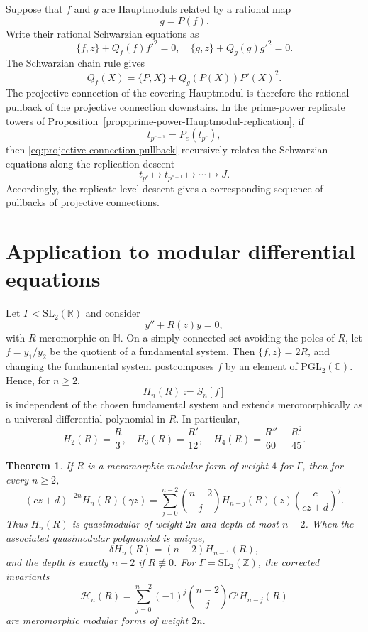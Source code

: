 \documentclass[11pt]{amsart}
\newtheorem{thm}{Theorem}[section]
\theoremstyle{definition}
\theoremstyle{remark}
\numberwithin{equation}{section}
\begin{document}
Suppose that $f$ and $g$ are Hauptmoduls related by a rational map
\[
g=P(f).
\]
Write their rational Schwarzian equations as
\[
\{f,z\}+Q_f(f)f'^2=0,
\quad
\{g,z\}+Q_g(g)g'^2=0.
\]
The Schwarzian chain rule gives
\begin{equation}\label{eq:projective-connection-pullback}
Q_f(X)
=
\{P,X\}+Q_g(P(X))P'(X)^2.
\end{equation}
The projective connection of the covering Hauptmodul is therefore the rational pullback of the projective connection downstairs. In the prime-power replicate towers of Proposition~\ref{prop:prime-power-Hauptmodul-replication}, if
\[
t_{p^{e-1}}=P_e(t_{p^e}),
\]
then \eqref{eq:projective-connection-pullback} recursively relates the Schwarzian equations along the replication descent
\[
t_{p^e}\longmapsto t_{p^{e-1}}\longmapsto\cdots\longmapsto J.
\]
Accordingly, the replicate level descent gives a corresponding sequence of pullbacks of projective connections.

\section{Application to modular differential equations}

Let \(\Gamma<\mathrm{SL}_2(\mathbb R)\) and consider
\begin{equation}\label{eq:ode}
y''+R(z)y=0,
\end{equation}
with \(R\) meromorphic on \(\mathbb H\). On a simply connected set avoiding the poles of \(R\), let \(f=y_1/y_2\) be the quotient of a fundamental system. Then \(\{f,z\}=2R\), and changing the fundamental system postcomposes \(f\) by an element of \(\mathrm{PGL}_2(\mathbb C)\). Hence, for \(n\ge2\),
\[
H_n(R):=S_n[f]
\]
is independent of the chosen fundamental system and extends meromorphically as a universal differential polynomial in \(R\). In particular,
\[
H_2(R)=\frac R3,
\quad
H_3(R)=\frac{R'}{12},
\quad
H_4(R)=\frac{R''}{60}+\frac{R^2}{45}.
\]

\begin{thm}\label{thm:ode-application}
If \(R\) is a meromorphic modular form of weight \(4\) for \(\Gamma\), then for every \(n\ge2\),
\begin{equation}\label{eq:H-transformation}
(cz+d)^{-2n}H_n(R)(\gamma z)
=
\sum_{j=0}^{n-2}\binom{n-2}{j}H_{n-j}(R)(z)
\left(\frac{c}{cz+d}\right)^j.
\end{equation}
Thus \(H_n(R)\) is quasimodular of weight \(2n\) and depth at most \(n-2\). When the associated quasimodular polynomial is unique,
\[
\delta H_n(R)=(n-2)H_{n-1}(R),
\]
and the depth is exactly \(n-2\) if \(R\not\equiv0\). For \(\Gamma=\mathrm{SL}_2(\mathbb Z)\), the corrected invariants
\[
\mathcal H_n(R)
=
\sum_{j=0}^{n-2}(-1)^j\binom{n-2}{j}C^jH_{n-j}(R)
\]
are meromorphic modular forms of weight \(2n\).
\end{thm}
\end{document}
